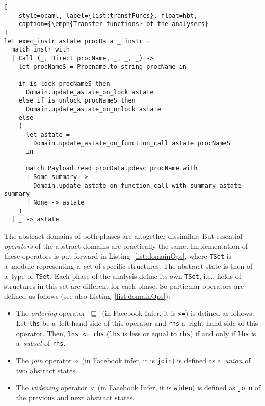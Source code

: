 \begin{lstlisting}[
    style=ocaml, label={list:transfFuncs}, float=hbt,
    caption={\emph{Transfer functions} of the analysers}
]
let exec_instr astate procData _ instr =
  match instr with
  | Call (_, Direct procName, _, _, _) ->
    let procNameS = Procname.to_string procName in

    if is_lock procNameS then
      Domain.update_astate_on_lock astate
    else if is_unlock procNameS then
      Domain.update_astate_on_unlock astate
    else
    (
      let astate =
        Domain.update_astate_on_function_call astate procNameS
      in

      match Payload.read procData.pdesc procName with
      | Some summary ->
        Domain.update_astate_on_function_call_with_summary astate summary
      | None -> astate
    )
  | _ -> astate
\end{lstlisting}

The abstract domains of both phases are altogether dissimilar. But
essential \emph{operators} of the abstract domains are practically the
same. Implementation of these operators is put forward in
Listing~\ref{list:domainOps}, where \texttt{TSet} is a~module
representing a~set of specific structures. The abstract state is then
of a~type of \texttt{TSet}. Each phase of the analysis define its
own \texttt{TSet}, i.e., fields of structures in this set are different
for each phase. So particular operators are defined as follows
(see also Listing~\ref{list:domainOps}):
\begin{itemize}
    \item
        The \emph{ordering} operator~$ \sqsubseteq $~(in Facebook Infer,
        it is \texttt{<=}) is defined as follows. Let \texttt{lhs} be
        a~left-hand side of this operator and \texttt{rhs} a~right-hand
        side of this operator. Then, \texttt{lhs~<=~rhs} (\texttt{lhs} is
        less or equal to \texttt{rhs}) if and only if
        \texttt{lhs} is a~\emph{subset} of \texttt{rhs}.

    \item
        The \emph{join} operator~$ \circ $~(in Facebook infer, it is
        \texttt{join}) is defined as a~\emph{union} of two abstract states.

    \item
        The \emph{widening} operator~$ \triangledown $~(in Facebook Infer,
        it is \texttt{widen}) is defined as \texttt{join} of the previous
        and next abstract states.
\end{itemize}

